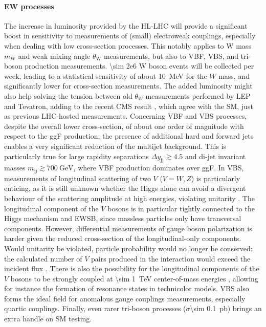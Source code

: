 \documentclass[11pt]{article}
\newcommand{\dijetmass}{m_{\text{jj}}}
\newcommand{\dijetrap}{y_{\text{jj}}}
\newcommand{\mw}{m_{\text{W}}}
\newcommand{\thw}{\theta_{\text{W}}}
\begin{document}
\paragraph{EW processes}

The increase in luminosity provided by the \ac{HL-LHC} will provide a significant boost in sensitivity to measurements of (small) electroweak couplings, especially when dealing with low cross-section processes.
This notably applies to W mass \(\mw\) and weak mixing angle \(\thw\) measurements, but also to \ac{VBF}, \ac{VBS}, and tri-boson production measurements.
\num{\sim 2e6} W boson events will be collected per week, leading to a statistical sensitivity of about \SI{10}{\MeV} for the \(W\) mass, and significantly lower for cross-section measurements.
The added luminosity might also help solving the tension between old \(\theta_{W}\) measurements performed by \ac{LEP} and Tevatron, adding to the recent \ac{CMS} result \cite{weak_mixing_angle_cms}, which agree with the \ac{SM}, just as previous \ac{LHC}-hosted measurements.
Concerning \ac{VBF} and \ac{VBS} processes, despite the overall lower cross-section, of about one order of magnitude with respect to the \ac{ggF} production, the presence of additional hard and forward jets enables a very significant reduction of the multijet background.
This is particularly true for large rapidity separations \(\Delta \dijetrap \gtrsim 4.5\) and di-jet invariant masses
\(\dijetmass \gtrsim \SI{700}{\GeV}\), where \ac{VBF} production dominates over \ac{ggF}.
In \ac{VBS}, measurements of longitudinal scattering of two \(V\) (\(V=W,Z\)) is particularly enticing, as it is still unknown whether the Higgs alone can avoid a divergent behaviour of the scattering amplitude at high energies, violating unitarity \cite{vbs2}.
The longitudinal component of the \(V\) bosons is in particular tightly connected to the Higgs mechanism and \ac{EWSB}, since massless particles only have transversal components.
However, differential measurements of gauge boson polarization is harder given the reduced cross-section of the longitudinal-only components.
Would unitarity be violated, particle probability would no longer be conserved: the calculated number of \(V\) pairs produced in the interaction would exceed the incident flux \cite{thomson}.
There is also the possibility for the longitudinal components of the \(V\) bosons to be strongly coupled at \SI{\sim 1}{\TeV} center-of-mass energies \cite{vbs1}, allowing for instance the formation of resonance states in technicolor models.
\ac{VBS} also forms the ideal field for anomalous gauge couplings measurements, especially quartic couplings.
Finally, even rarer tri-boson processes (\(\sigma\)\SI{\sim 0.1}{\pico\barn}) brings an extra handle on \ac{SM} testing.
\end{document}
